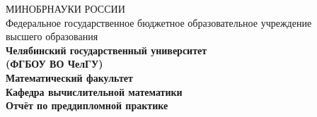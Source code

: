 \documentclass[12pt,a4paper,titlepage]{article}
\theoremstyle{definition}
\begin{document}
\begin{titlepage}
\begin{center}
  МИНОБРНАУКИ РОССИИ\\
  Федеральное государственное бюджетное образовательное учреждение\\ высшего образования\\

\bfseries \flqq Челябинский государственный университет\frqq \\
\bfseries (ФГБОУ ВО \flqq ЧелГУ\frqq) \\[0.7cm]

Математический факультет\\
Кафедра вычислительной математики\\[3.4cm]
\large\bfseries Отчёт по преддипломной практике\\[2cm]


\end{center}
\end{titlepage}
\end{document}
